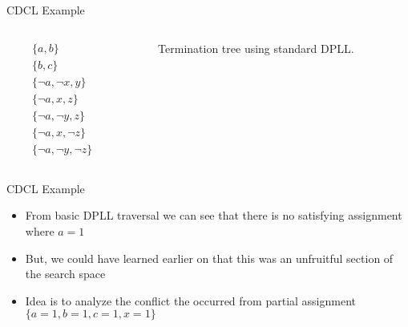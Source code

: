 \documentclass{beamer}
\begin{document}

\begin{frame}{CDCL Example}

    \begin{columns}
        \begin{column}{0.2\textwidth}
            \begin{align*}
                &\{a,b\}\\
                &\{b,c\}\\
                &\{\neg a, \neg x, y\} \\
                &\{\neg a, x, z\} \\
                &\{ \neg a, \neg y, z\} \\
                &\{ \neg a, x, \neg z\} \\
                &\{ \neg a, \neg y, \neg z\}
            \end{align*}
        \end{column}

        \begin{column}{0.73\textwidth}
            \begin{figure}
                
                \caption{Termination tree using standard DPLL.}
            \end{figure}
        \end{column}
    \end{columns}
\end{frame}

\begin{frame}{CDCL Example}
\begin{itemize}
    \item From basic DPLL traversal we can see that there is no satisfying assignment where $a=1$
    \item But, we could have learned earlier on that this was an unfruitful section of the search space
    \item Idea is to analyze the conflict the occurred from partial assignment $\{a=1,b=1,c=1,x=1\}$
\end{itemize}
\end{frame}
\end{document}
